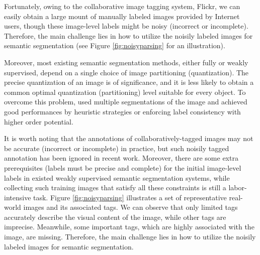  Fortunately, owing to the collaborative image tagging system, \eg Flickr, we can easily obtain a large mount of manually labeled images provided by Internet users, though these image-level labels might be noisy (incorrect or incomplete). Therefore, the main challenge lies in how to utilize the noisily labeled images for semantic segmentation (see Figure \ref{fig:noisyparsing} for an illustration).


 Moreover, most existing semantic segmentation methods, either fully or weakly supervised, depend on a single choice of image partitioning (quantization). The precise quantization of an image is of significance, and it is less likely to obtain a common optimal quantization (partitioning) level suitable for every object. To overcome this problem, \cite{hoiem2005geometric,kohli2009robust,ladicky2009associative,nowozin2010parameter,russell2006using} used multiple segmentations of the image and achieved good performances by heuristic strategies or enforcing label consistency with higher order potential.

It is worth noting that the annotations of collaboratively-tagged images may not be accurate (incorrect or incomplete) in practice, but such noisily tagged annotation has been ignored in recent work. Moreover, there are some extra prerequisites (\eg labels must be precise and complete) for the initial image-level labels in existed weakly supervised semantic segmentation systems, while collecting such training images that satisfy all these constraints is still a labor-intensive task. Figure \ref{fig:noisyparsing} illustrates a set of representative real-world images and its associated tags. We can observe that only limited tags accurately describe the visual content of the image, while other tags are imprecise. Meanwhile, some important tags, which are highly associated with the image, are missing. Therefore, the main challenge lies in how to utilize the noisily labeled images for semantic segmentation.
\fi
